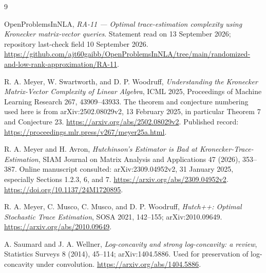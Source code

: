 \documentclass[11pt]{article}
\theoremstyle{definition}\newtheorem{definition}[theorem]{Definition}
\theoremstyle{remark}\newtheorem{remark}[theorem]{Remark}
\begin{document}
\begin{thebibliography}{9}
\raggedright
{}
OpenProblemsInNLA, \emph{RA-11 --- Optimal trace-estimation complexity using
Kronecker matrix-vector queries}. Statement read on 13 September 2026;
repository last-check field 10 September 2026.
\url{https://github.com/ajt60gaibb/OpenProblemsInNLA/tree/main/randomized-and-low-rank-approximation/RA-11}.

R. A. Meyer, W. Swartworth, and D. P. Woodruff,
\emph{Understanding the Kronecker Matrix-Vector Complexity of Linear Algebra},
ICML 2025, Proceedings of Machine Learning Research 267, 43909--43933.
The theorem and conjecture numbering used here is from arXiv:2502.08029v2,
13 February 2025, in particular Theorem 7 and Conjecture 23.
\url{https://arxiv.org/abs/2502.08029v2}.
Published record: \url{https://proceedings.mlr.press/v267/meyer25a.html}.

R. A. Meyer and H. Avron,
\emph{Hutchinson's Estimator is Bad at Kronecker-Trace-Estimation},
SIAM Journal on Matrix Analysis and Applications 47 (2026), 353--387.
Online manuscript consulted: arXiv:2309.04952v2, 31 January 2025,
especially Sections 1.2.3, 6, and 7.
\url{https://arxiv.org/abs/2309.04952v2}.
\url{https://doi.org/10.1137/24M1720895}.

R. A. Meyer, C. Musco, C. Musco, and D. P. Woodruff,
\emph{Hutch++: Optimal Stochastic Trace Estimation},
SOSA 2021, 142--155; arXiv:2010.09649.
\url{https://arxiv.org/abs/2010.09649}.

A. Saumard and J. A. Wellner,
\emph{Log-concavity and strong log-concavity: a review},
Statistics Surveys 8 (2014), 45--114; arXiv:1404.5886.
Used for preservation of log-concavity under convolution.
\url{https://arxiv.org/abs/1404.5886}.
\end{thebibliography}
\end{document}
